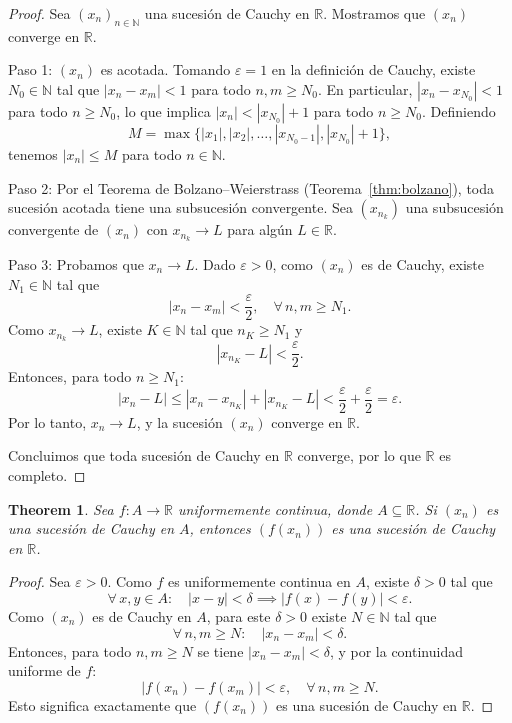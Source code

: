 \documentclass[11pt,a4paper]{article}
\theoremstyle{plain}
\newtheorem{theorem}{Theorem}[section]
\theoremstyle{definition}
\begin{document}
\begin{proof}
Sea $(x_n)_{n \in \mathbb{N}}$ una sucesión de Cauchy en $\mathbb{R}$. Mostramos que $(x_n)$ converge en $\mathbb{R}$.

Paso 1: $(x_n)$ es acotada. Tomando $\varepsilon = 1$ en la definición de Cauchy, existe $N_0 \in \mathbb{N}$ tal que $|x_n - x_m| < 1$ para todo $n, m \geq N_0$. En particular, $|x_n - x_{N_0}| < 1$ para todo $n \geq N_0$, lo que implica $|x_n| < |x_{N_0}| + 1$ para todo $n \geq N_0$. Definiendo
\[
M = \max\{|x_1|, |x_2|, \ldots, |x_{N_0-1}|, |x_{N_0}| + 1\},
\]
tenemos $|x_n| \leq M$ para todo $n \in \mathbb{N}$.

Paso 2: Por el Teorema de Bolzano--Weierstrass (Teorema~\ref{thm:bolzano}), toda sucesión acotada tiene una subsucesión convergente. Sea $(x_{n_k})$ una subsucesión convergente de $(x_n)$ con $x_{n_k} \to L$ para algún $L \in \mathbb{R}$.

Paso 3: Probamos que $x_n \to L$. Dado $\varepsilon > 0$, como $(x_n)$ es de Cauchy, existe $N_1 \in \mathbb{N}$ tal que
\[
|x_n - x_m| < \frac{\varepsilon}{2}, \quad \forall\, n, m \geq N_1.
\]
Como $x_{n_k} \to L$, existe $K \in \mathbb{N}$ tal que $n_K \geq N_1$ y
\[
|x_{n_K} - L| < \frac{\varepsilon}{2}.
\]
Entonces, para todo $n \geq N_1$:
\[
|x_n - L| \leq |x_n - x_{n_K}| + |x_{n_K} - L| < \frac{\varepsilon}{2} + \frac{\varepsilon}{2} = \varepsilon.
\]
Por lo tanto, $x_n \to L$, y la sucesión $(x_n)$ converge en $\mathbb{R}$.

Concluimos que toda sucesión de Cauchy en $\mathbb{R}$ converge, por lo que $\mathbb{R}$ es completo.
\end{proof}

\begin{theorem}\label{thm:uniforme_cauchy}
Sea $f: A \to \mathbb{R}$ uniformemente continua, donde $A \subseteq \mathbb{R}$. Si $(x_n)$ es una sucesión de Cauchy en $A$, entonces $(f(x_n))$ es una sucesión de Cauchy en $\mathbb{R}$.
\end{theorem}

\begin{proof}
Sea $\varepsilon > 0$. Como $f$ es uniformemente continua en $A$, existe $\delta > 0$ tal que
\[
\forall\, x, y \in A: \quad |x - y| < \delta \implies |f(x) - f(y)| < \varepsilon.
\]
Como $(x_n)$ es de Cauchy en $A$, para este $\delta > 0$ existe $N \in \mathbb{N}$ tal que
\[
\forall\, n, m \geq N: \quad |x_n - x_m| < \delta.
\]
Entonces, para todo $n, m \geq N$ se tiene $|x_n - x_m| < \delta$, y por la continuidad uniforme de $f$:
\[
|f(x_n) - f(x_m)| < \varepsilon, \quad \forall\, n, m \geq N.
\]
Esto significa exactamente que $(f(x_n))$ es una sucesión de Cauchy en $\mathbb{R}$.
\end{proof}
\end{document}

